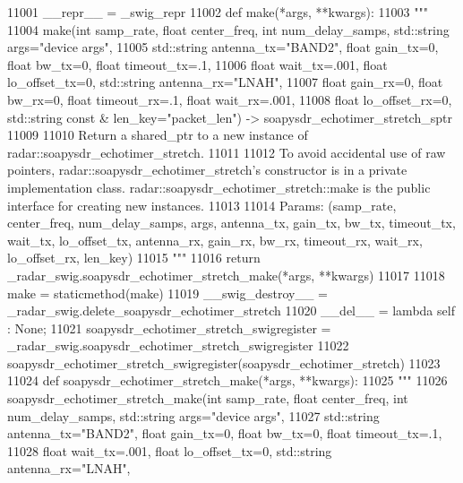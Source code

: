 \begin{DoxyCode}
{{{{{{{{{{{{{{{{{{{{{{{{{{{{{{{{{{{11001     \_\_repr\_\_ = \_swig\_repr
11002     \textcolor{keyword}{def }make(*args, **kwargs):
11003         \textcolor{stringliteral}{"""}
11004 \textcolor{stringliteral}{        make(int samp\_rate, float center\_freq, int num\_delay\_samps, std::string args="device args", }
11005 \textcolor{stringliteral}{            std::string antenna\_tx="BAND2", float gain\_tx=0, float bw\_tx=0, float timeout\_tx=.1, }
11006 \textcolor{stringliteral}{            float wait\_tx=.001, float lo\_offset\_tx=0, std::string antenna\_rx="LNAH", }
11007 \textcolor{stringliteral}{            float gain\_rx=0, float bw\_rx=0, float timeout\_rx=.1, float wait\_rx=.001, }
11008 \textcolor{stringliteral}{            float lo\_offset\_rx=0, std::string const & len\_key="packet\_len") ->
       soapysdr\_echotimer\_stretch\_sptr}
11009 \textcolor{stringliteral}{}
11010 \textcolor{stringliteral}{        Return a shared\_ptr to a new instance of radar::soapysdr\_echotimer\_stretch.}
11011 \textcolor{stringliteral}{}
11012 \textcolor{stringliteral}{        To avoid accidental use of raw pointers, radar::soapysdr\_echotimer\_stretch's constructor is in a
       private implementation class. radar::soapysdr\_echotimer\_stretch::make is the public interface for creating new
       instances.}
11013 \textcolor{stringliteral}{}
11014 \textcolor{stringliteral}{        Params: (samp\_rate, center\_freq, num\_delay\_samps, args, antenna\_tx, gain\_tx, bw\_tx, timeout\_tx,
       wait\_tx, lo\_offset\_tx, antenna\_rx, gain\_rx, bw\_rx, timeout\_rx, wait\_rx, lo\_offset\_rx, len\_key)}
11015 \textcolor{stringliteral}{        """}
11016         \textcolor{keywordflow}{return} \_radar\_swig.soapysdr\_echotimer\_stretch\_make(*args, **kwargs)
11017 
11018     make = staticmethod(make)
11019     \_\_swig\_destroy\_\_ = \_radar\_swig.delete\_soapysdr\_echotimer\_stretch
11020     \_\_del\_\_ = \textcolor{keyword}{lambda} self : \textcolor{keywordtype}{None};
11021 soapysdr\_echotimer\_stretch\_swigregister = \_radar\_swig.soapysdr\_echotimer\_stretch\_swigregister
11022 soapysdr_echotimer_stretch_swigregister(soapysdr\_echotimer\_stretch)
11023 
11024 \textcolor{keyword}{def }soapysdr_echotimer_stretch_make(*args, **kwargs):
11025   \textcolor{stringliteral}{"""}
11026 \textcolor{stringliteral}{    soapysdr\_echotimer\_stretch\_make(int samp\_rate, float center\_freq, int num\_delay\_samps, std::string
       args="device args", }
11027 \textcolor{stringliteral}{        std::string antenna\_tx="BAND2", float gain\_tx=0, float bw\_tx=0, float timeout\_tx=.1, }
11028 \textcolor{stringliteral}{        float wait\_tx=.001, float lo\_offset\_tx=0, std::string antenna\_rx="LNAH", }
}}}}}}}}}}}}}}}}}}}}}}}}}}}}}}}}}}}
\end{DoxyCode}
